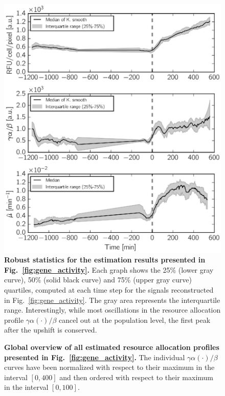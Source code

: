 \begin{figure}[p]
\centering
\includegraphics[scale=1]{./Fig/gene_activity_median}
\caption{
\textbf{Robust statistics for the estimation results presented in Fig.~\ref{fig:gene_activity}.}
Each graph shows the 25\% (lower gray curve), 50\% (solid black curve) and 75\% (upper gray curve) quartiles, computed at each time step for the signals reconstructed in Fig.~\ref{fig:gene_activity}.
The gray area represents the interquartile range.
Interestingly, while most oscillations in the resource allocation profile $\gamma \alpha (\cdot) / \beta$ cancel out at the population level, the first peak after the upshift is conserved.
}
\label{fig:gene_activity_median}
\end{figure}

\begin{figure}[tb]
\centering
\caption{
\textbf{Global overview of all estimated resource allocation profiles presented in Fig.~\ref{fig:gene_activity}.}
The individual $\gamma \alpha (\cdot) / \beta$  curves have been normalized with respect to their maximum in the interval $[0, 400]$ and then ordered with respect to their maximum in the interval $[0, 100]$.
}
\label{fig:gene_activity_heatmap}
\end{figure}

